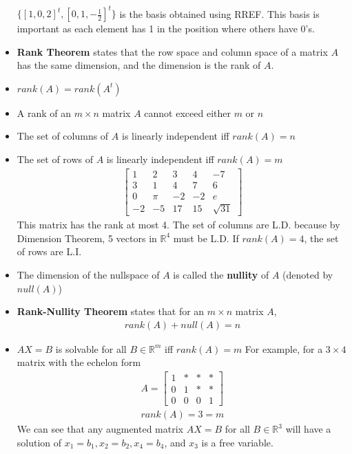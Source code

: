 \begin{itemize}
\begin{align*}
    \end{align*}
    $\{ [1, 0, 2]^t, [0, 1, -\frac{1}{2}]^t \}$ is the basis obtained using RREF.
    This basis is important as each element has 1 in the position where others have 0's.
  \item \textbf{Rank Theorem} states that the row space and column space of a matrix $A$ has the same dimension, and the dimension is the rank of $A$.
  \item $rank(A) = rank(A^t)$
  \item A rank of an $m \times n$ matrix $A$ cannot exceed either $m$ or $n$
  \item The set of columns of $A$ is linearly independent iff $rank(A) = n$
  \item The set of rows of $A$ is linearly independent iff $rank(A) = m$
    \begin{align*}
      \begin{bmatrix}
        1 & 2 & 3 & 4 & -7 \\
        3 & 1 & 4 & 7 & 6 \\
        0 & \pi & -2 & -2 & e \\
        -2 & -5 & 17 & 15 & \sqrt{31}
      \end{bmatrix}
    \end{align*}
    This matrix has the rank at most 4.
    The set of columns are L.D. because by Dimension Theorem, 5 vectors in $\mathbb{R}^4$ must be L.D.
    If $rank(A) = 4$, the set of rows are L.I.
  \item The dimension of the nullspace of $A$ is called the \textbf{nullity} of $A$ (denoted by $null(A)$)
  \item \textbf{Rank-Nullity Theorem} states that for an $m \times n$ matrix $A$,
    \begin{align*}
      rank(A) + null(A) = n
    \end{align*}
  \item $AX = B$ is solvable for all $B \in \mathbb{R}^m$ iff $rank(A) = m$
    For example, for a $3 \times 4$ matrix with the echelon form
    \begin{align*}
      A = \begin{bmatrix}
        1 & * & * & *\\
        0 & 1 & * & *\\
        0 & 0 & 0 & 1
      \end{bmatrix}
      \\
      rank(A) = 3 = m
    \end{align*}
    We can see that any augmented matrix $AX = B$ for all $B \in \mathbb{R}^3$ will have a solution of $x_1 = b_1, x_2 = b_2, x_4 = b_4$, and $x_3$ is a free variable.

\end{itemize}
